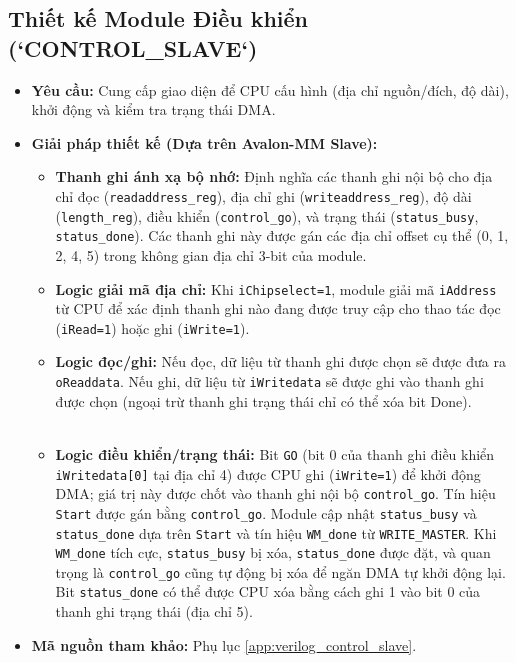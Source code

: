 \subsection{Thiết kế Module Điều khiển (`CONTROL\_SLAVE`)}
\begin{itemize}
    \item \textbf{Yêu cầu:} Cung cấp giao diện để CPU cấu hình (địa chỉ nguồn/đích, độ dài), khởi động và kiểm tra trạng thái DMA.
    \item \textbf{Giải pháp thiết kế (Dựa trên Avalon-MM Slave):}
        \begin{itemize}
            \item \textbf{Thanh ghi ánh xạ bộ nhớ:} Định nghĩa các thanh ghi nội bộ cho địa chỉ đọc (\texttt{readaddress\_reg}), địa chỉ ghi (\texttt{writeaddress\_reg}), độ dài (\texttt{length\_reg}), điều khiển (\texttt{control\_go}), và trạng thái (\texttt{status\_busy}, \texttt{status\_done}). Các thanh ghi này được gán các địa chỉ offset cụ thể (0, 1, 2, 4, 5) trong không gian địa chỉ 3-bit của module.
            \item \textbf{Logic giải mã địa chỉ:} Khi \texttt{iChipselect=1}, module giải mã \texttt{iAddress} từ CPU để xác định thanh ghi nào đang được truy cập cho thao tác đọc (\texttt{iRead=1}) hoặc ghi (\texttt{iWrite=1}).
            \item \textbf{Logic đọc/ghi:} Nếu đọc, dữ liệu từ thanh ghi được chọn sẽ được đưa ra \texttt{oReaddata}. Nếu ghi, dữ liệu từ \texttt{iWritedata} sẽ được ghi vào thanh ghi được chọn (ngoại trừ thanh ghi trạng thái chỉ có thể xóa bit Done).
            \item \textbf{Logic điều khiển/trạng thái:} Bit \texttt{GO} (bit 0 của thanh ghi điều khiển \texttt{iWritedata[0]} tại địa chỉ 4) được CPU ghi (\texttt{iWrite=1}) để khởi động DMA; giá trị này được chốt vào thanh ghi nội bộ \texttt{control\_go}. Tín hiệu \texttt{Start} được gán bằng \texttt{control\_go}. Module cập nhật \texttt{status\_busy} và \texttt{status\_done} dựa trên \texttt{Start} và tín hiệu \texttt{WM\_done} từ \texttt{WRITE\_MASTER}. Khi \texttt{WM\_done} tích cực, \texttt{status\_busy} bị xóa, \texttt{status\_done} được đặt, và quan trọng là \texttt{control\_go} cũng tự động bị xóa để ngăn DMA tự khởi động lại. Bit \texttt{status\_done} có thể được CPU xóa bằng cách ghi 1 vào bit 0 của thanh ghi trạng thái (địa chỉ 5).
        \end{itemize}
    \item \textbf{Mã nguồn tham khảo:} Phụ lục \ref{app:verilog_control_slave}.
\end{itemize}

